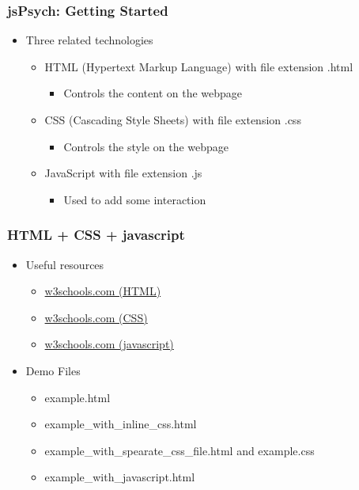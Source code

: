 \documentclass[t]{beamer}
\begin{document}
\begin{frame}[fragile]
    \frametitle{jsPsych: Getting Started}
    \begin{itemize}
        \item Three related technologies 
            \begin{itemize}
                \item HTML (Hypertext Markup Language) with file extension .html 
                    \begin{itemize}
                        \item Controls the content on the webpage
                    \end{itemize}
                \item CSS (Cascading Style Sheets) with file extension .css
                    \begin{itemize}
                        \item Controls the style on the webpage
                    \end{itemize}
                \item JavaScript with file extension .js
                    \begin{itemize}
                        \item Used to add some interaction
                    \end{itemize}
            \end{itemize}
    \end{itemize}
\end{frame}


\begin{frame}[fragile]
    \frametitle{HTML + CSS + javascript}
    \begin{itemize}
        \item Useful resources
            \begin{itemize}
                \item \href{https://www.w3schools.com/html/default.asp}{w3schools.com (HTML)}
                \item \href{https://www.w3schools.com/css/default.asp}{w3schools.com (CSS)}
                \item \href{https://www.w3schools.com/js/DEFAULT.asp}{w3schools.com (javascript)}
            \end{itemize}
        \item Demo Files
            \begin{itemize}
                \item example.html
                \item example\_with\_inline\_css.html
                \item example\_with\_spearate\_css\_file.html and example.css
                \item example\_with\_javascript.html
            \end{itemize}
    \end{itemize}
\end{frame}
\end{document}
